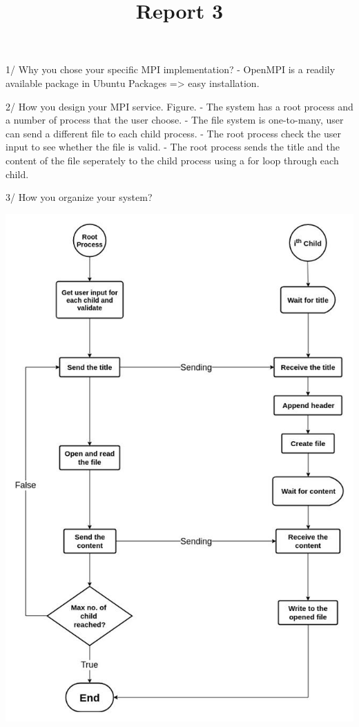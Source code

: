 \documentclass[12pt,a4paper]{article}
\title{Report 3}
\begin{document}
 1/ Why you chose your specific MPI implementation?
- OpenMPI is a readily available package in Ubuntu Packages => easy installation.

2/ How you design your MPI service. Figure.
- The system has a root process and a number of process that the user choose.
- The file system is one-to-many, user can send a different file to each child process.
- The root process check the user input to see whether the file is valid.
- The root process sends the title and the content of the file seperately to the child process using a for loop through each child.

3/ How you organize your system?

\includegraphics[scale=0.6]{mpi}
\end{document}
